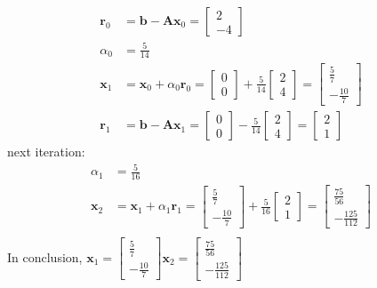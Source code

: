 \documentclass{article}
\begin{document}
\begin{align*}
    \bm{r}_0 &= \bm{b} - \bm{A}\bm{x}_0 = \begin{bmatrix}
        2\\
        -4
    \end{bmatrix} \\
    \alpha_0 &= \frac{5}{14} \\
    \bm{x}_1 &= \bm{x}_0 + \alpha_0 \bm{r}_0 =  \begin{bmatrix}
        0\\
        0
    \end{bmatrix} + \frac{5}{14}\begin{bmatrix}
        2 \\
        4
    \end{bmatrix} = \begin{bmatrix}
        \frac{5}{7} \\
        -\frac{10}{7}
    \end{bmatrix}\\
    \bm{r}_1 &= \bm{b} - \bm{A}\bm{x}_1 = \begin{bmatrix}
        0\\
        0
    \end{bmatrix} - \frac{5}{14}\begin{bmatrix}
        2 \\
        4
    \end{bmatrix} = \begin{bmatrix}
        2\\
        1
    \end{bmatrix}
\end{align*}
next iteration:
\begin{align*}
    \alpha_1 &= \frac{5}{16} \\
    \bm{x}_2 &= \bm{x}_1 + \alpha_1 \bm{r}_1 = \begin{bmatrix}
        \frac{5}{7} \\
        -\frac{10}{7}
    \end{bmatrix} + \frac{5}{16} \begin{bmatrix}
        2 \\
        1
    \end{bmatrix} = \begin{bmatrix}
        \frac{75}{56} \\
        -\frac{125}{112}
    \end{bmatrix} \\
\end{align*}
In conclusion, \(\bm{x}_1 = \begin{bmatrix}
    \frac{5}{7} \\
    -\frac{10}{7}
\end{bmatrix} \bm{x}_2 = \begin{bmatrix}
    \frac{75}{56} \\
    -\frac{125}{112}
\end{bmatrix}\)
\end{document}
